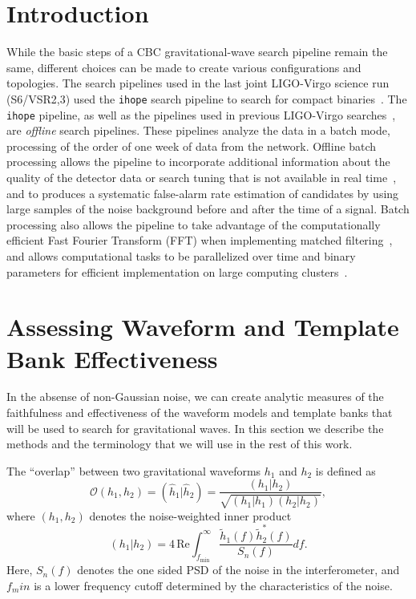 \section{Introduction}

While the basic steps of a CBC gravitational-wave search pipeline remain the same, 
different choices can be made to
create various configurations and topologies. The search
pipelines used in the last joint LIGO-Virgo science run (S6/VSR2,3) used the
\texttt{ihope} search pipeline to search for compact
binaries~\cite{Babak:2012zx}. The \texttt{ihope} pipeline, as well as the
pipelines used in previous LIGO-Virgo
searches~\cite{Brown:2004pv,Brown:2005zs}, are \emph{offline} search
pipelines. These pipelines analyze the data in a batch mode, processing
of the order of one week of data from the network. Offline batch
processing allows the pipeline to incorporate additional information about the
quality of the detector data or search tuning that is not available in real
time~\cite{Aasi:2012wd,Aasi:2014mqd}, and to produces a systematic false-alarm rate
estimation of candidates by using large samples of the noise background before
and after the time of a signal. Batch processing also allows the pipeline to
take advantage of the computationally efficient Fast Fourier Transform (FFT)
when implementing matched filtering~\cite{Allen:2005fk}, and allows
computational tasks to be parallelized over time and binary parameters for
efficient implementation on large computing clusters~\cite{Brown:workflow}.

\section{Assessing Waveform and Template Bank Effectiveness}
\label{sec:analytic_vol}

In the absense of non-Gaussian noise, we can create analytic measures of the
faithfulness and effectiveness of the waveform models and template banks that 
will be used to search for gravitational waves. In this section we describe 
the methods and the terminology that we will use in the rest of this work.

The ``overlap'' between two gravitational waveforms $h_1$ and $h_2$ is defined as
%
\begin{equation}
 \mathcal{O}(h_1,h_2) = (\hat{h}_1|\hat{h}_2) =
\dfrac{(h_1|h_2)}{\sqrt{(h_1|h_1)(h_2|h_2)}},
\end{equation}
%
where $(h_1,h_2)$ denotes the noise-weighted inner product
%
\begin{equation}
(h_1|h_2) = 4 \, \mathrm{Re}
\int^{\infty}_{f_{\mathrm{min}}}\dfrac{\tilde{h}_1(f)\tilde{h}_2^*(f)}{S_n(f)} 
df.
\end{equation}
%
Here, $S_n(f)$ denotes the one sided \ac{PSD} of the noise in the
interferometer, and $f_min$ is a lower frequency cutoff determined by the
characteristics of the noise.

